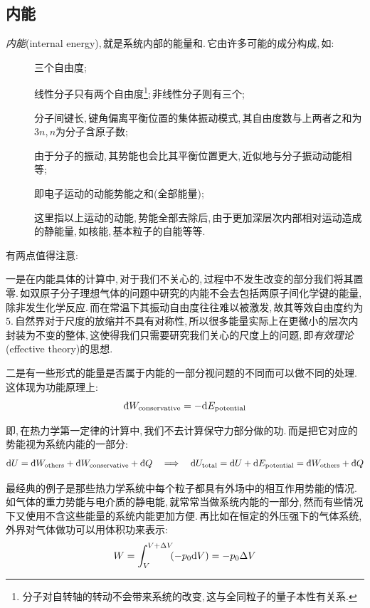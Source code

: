 \subsection{内能}
\emph{内能}(internal energy),\,就是系统内部的能量和.\,它由许多可能的成分构成,\,如:
\begin{description}
	\item[\quad {}]		三个自由度;
	\item[\quad {}]		线性分子只有两个自由度\footnote{分子对自转轴的转动不会带来系统的改变,\,这与全同粒子的量子本性有关系.};\,非线性分子则有三个;
	\item[\quad {}]		分子间键长,\,键角偏离平衡位置的集体振动模式,\,其自由度数与上两者之和为$3n$,\,$n$为分子含原子数;
	\item[\quad {}]		由于分子的振动,\,其势能也会比其平衡位置更大,\,近似地与分子振动动能相等;
	\item[\quad {}]				即电子运动的动能势能之和(全部能量);
	\item[\quad {}]				这里指以上运动的动能,\,势能全部去除后,\,由于更加深层次内部相对运动造成的静能量,\,如核能,\,基本粒子的自能等等.
\end{description}

有两点值得注意:

一是在内能具体的计算中,\,对于我们不关心的,\,过程中不发生改变的部分我们将其置零.\,如双原子分子理想气体的问题中研究的内能不会去包括两原子间化学键的能量,\,除非发生化学反应.\,而在常温下其振动自由度往往难以被激发,\,故其等效自由度约为$5$.\,自然界对于尺度的放缩并不具有对称性,\,所以很多能量实际上在更微小的层次内封装为不变的整体,\,这使得我们只需要研究我们关心的尺度上的问题,\,即\emph{有效理论}(effective theory)的思想.

二是有一些形式的能量是否属于内能的一部分视问题的不同而可以做不同的处理.\,这体现为功能原理上:
\[\dbar W_{\rm conservative}=-\ud E_{\rm potential}\]

即,\,在热力学第一定律的计算中,\,我们不去计算保守力部分做的功.\,而是把它对应的势能视为系统内能的一部分:
\[\ud U=\dbar W_{\rm others} + \dbar W_{\rm conservative} +\dbar Q \quad \Longrightarrow \quad \ud U_{\rm total}=\ud U + \ud E_{\rm potential}=\dbar W_{\rm others}+\dbar Q\]

最经典的例子是那些热力学系统中每个粒子都具有外场中的相互作用势能的情况.\,如气体的重力势能与电介质的静电能,\,就常常当做系统内能的一部分,\,然而有些情况下又使用不含这些能量的系统内能更加方便.\,再比如在恒定的外压强下的气体系统,\,外界对气体做功可以用体积功来表示:
\[W=\int_{V}^{V+\Delta V} \!\!(-p_0 \textrm{d} V)=-p_0 \Delta V\]

